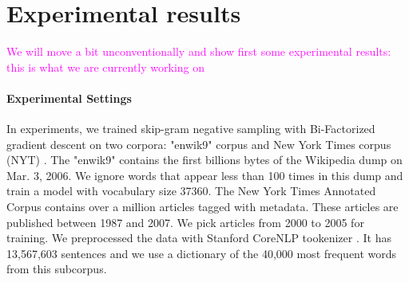 \documentclass[letterpaper]{article} %
\begin{document}
\section{Experimental results}
\textcolor{magenta}{We will move a bit unconventionally and show first some experimental results: this is what we are currently working on}
\paragraph{Experimental Settings} In experiments, we trained skip-gram negative sampling with Bi-Factorized gradient descent on two corpora:  "enwik9" corpus \cite{mahoney2011large} and New York Times corpus (NYT) \cite{sandhaus2008new}. The "enwik9" contains the first billions bytes of the Wikipedia dump on Mar. 3, 2006. We ignore words that appear less than 100 times in this dump and train a model with vocabulary size 37360. The New York Times Annotated Corpus contains over a million articles tagged with metadata. These articles are published between 1987 and 2007. We pick articles from 2000 to 2005 for training.  We preprocessed the data with Stanford CoreNLP tookenizer \cite{manning2014stanford}. It has 13,567,603 sentences and we use a dictionary of the 40,000 most frequent words from this subcorpus.
\end{document}
